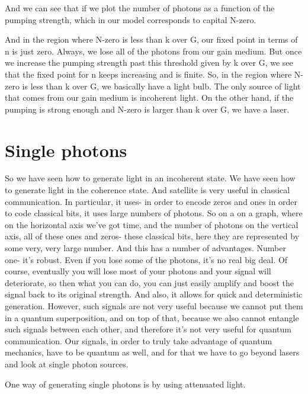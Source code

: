 And we can see that if we plot the number of photons as a function of the pumping strength, which in our model corresponds to capital N-zero.

And in the region where N-zero is less than k over G, our fixed point in terms of n is just zero. Always, we lose all of the photons from our gain medium. But once we increase the pumping strength past this threshold given by k over G, we see that the fixed point for n keeps increasing and is finite. So, in the region where N-zero is less than k over G, we basically have a light bulb. The only source of light that comes from our gain medium is incoherent light. On the other hand, if the pumping is strong enough and N-zero is larger than k over G, we have a laser.

\section{Single photons}


So we have seen how to generate light in an incoherent state. We have seen how to generate light in the coherence state. And satellite is very useful in classical communication. In particular, it uses- in order to encode zeros and ones in order to code classical bits, it uses large numbers of photons. So on a on a graph, where on the horizontal axis we've got time, and the number of photons on the vertical axis, all of these ones and zeros- these classical bits, here they are represented by some very, very large number. And this has a number of advantages. Number one- it's robust. Even if you lose some of the photons, it's no real big deal. Of course, eventually you will lose most of your photons and your signal will deteriorate, so then what you can do, you can just easily amplify and boost the signal back to its original strength. And also, it allows for quick and deterministic generation. However, such signals are not very useful because we cannot put them in a quantum superposition, and on top of that, because we also cannot entangle such signals between each other, and therefore it's not very useful for quantum communication. Our signals, in order to truly take advantage of quantum mechanics, have to be quantum as well, and for that we have to go beyond lasers and look at single photon sources.

One way of generating single photons is by using attenuated light.

